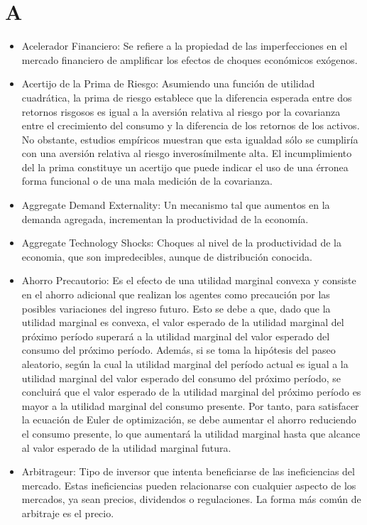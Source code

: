 \documentclass{article}
\begin{document}
\section{A}
\begin{itemize}

\item Acelerador Financiero: Se refiere a la propiedad de las imperfecciones en el mercado financiero de amplificar los efectos de choques económicos exógenos.

\item Acertijo de la Prima de Riesgo: Asumiendo una función de utilidad cuadrática, la prima de riesgo establece que la diferencia esperada entre dos retornos risgosos es igual a la aversión relativa al riesgo por la covarianza entre el crecimiento del consumo y la diferencia de los retornos de los activos. No obstante, estudios empíricos muestran que esta igualdad sólo se cumpliría con una aversión relativa al riesgo inverosímilmente alta. El incumplimiento del la prima constituye un acertijo que puede indicar el uso de una érronea forma funcional o de una mala medición de la covarianza.

\item Aggregate Demand Externality: Un mecanismo tal que aumentos en la demanda agregada, incrementan la productividad de la economía.

\item Aggregate Technology Shocks: Choques al nivel de la productividad de la economia, que son impredecibles, aunque de distribución conocida.

\item Ahorro Precautorio: Es el efecto de una utilidad marginal convexa y consiste en el ahorro adicional que realizan los agentes como precaución por las posibles variaciones del ingreso futuro. Esto se debe a que, dado que la utilidad marginal es convexa, el valor esperado de la utilidad marginal del próximo período superará a la utilidad marginal del valor esperado del consumo del próximo período. Además, si se toma la hipótesis del paseo aleatorio, según la cual la utilidad marginal del período actual es igual a la utilidad marginal del valor esperado del consumo del próximo período, se concluirá que el valor esperado de la utilidad marginal del próximo período es mayor a la utilidad marginal del consumo presente. Por tanto, para satisfacer la ecuación de Euler de optimización, se debe aumentar el ahorro reduciendo el consumo presente, lo que aumentará la utilidad marginal hasta que alcance al valor esperado de la utilidad marginal futura. 

\item Arbitrageur: Tipo de inversor que intenta beneficiarse de las ineficiencias del mercado. Estas ineficiencias pueden relacionarse con cualquier aspecto de los mercados, ya sean precios, dividendos o regulaciones. La forma más común de arbitraje es el precio.

\end{itemize}
\end{document}
